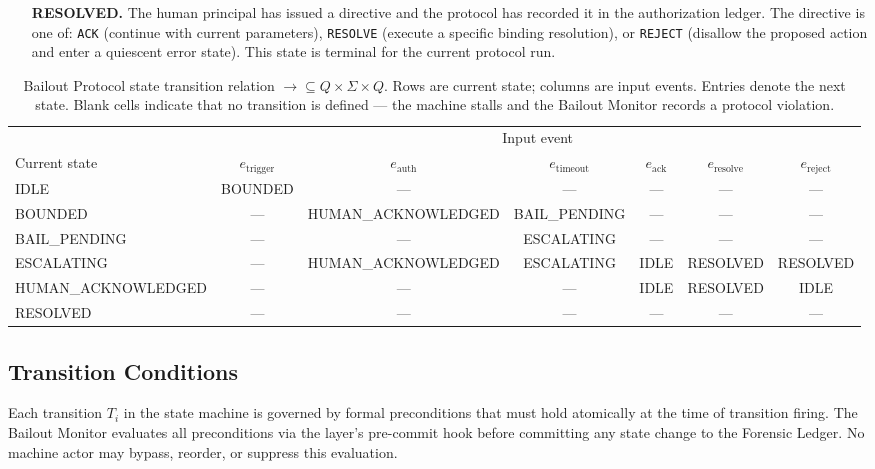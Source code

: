\begin{itemize}
\item[\textbf{RESOLVED.}] The human principal has issued a directive and the protocol has recorded it in the authorization ledger. The directive is one of: \texttt{ACK} (continue with current parameters), \texttt{RESOLVE} (execute a specific binding resolution), or \texttt{REJECT} (disallow the proposed action and enter a quiescent error state). This state is terminal for the current protocol run.
\end{itemize}

\begin{table}[htbp]
\caption{Bailout Protocol state transition relation $\rightarrow \subseteq Q \times \Sigma \times Q$. Rows are current state; columns are input events. Entries denote the next state. Blank cells indicate that no transition is defined — the machine stalls and the Bailout Monitor records a protocol violation.}
\label{tab:bailout-transition}
\begin{tabular}{@{}lcccccc@{}}
\toprule
 & \multicolumn{6}{c}{Input event} \\
\cmidrule(l){2-7}
Current state & $e_{\text{trigger}}$ & $e_{\text{auth}}$ & $e_{\text{timeout}}$ & $e_{\text{ack}}$ & $e_{\text{resolve}}$ & $e_{\text{reject}}$ \\
\midrule
IDLE              & BOUNDED            & — & — & — & — & — \\
BOUNDED           & — & HUMAN\_ACKNOWLEDGED & BAIL\_PENDING & — & — & — \\
BAIL\_PENDING     & — & — & ESCALATING & — & — & — \\
ESCALATING        & — & HUMAN\_ACKNOWLEDGED & ESCALATING & IDLE & RESOLVED & RESOLVED \\
HUMAN\_ACKNOWLEDGED & — & — & — & IDLE & RESOLVED & IDLE \\
RESOLVED          & — & — & — & — & — & — \\
\bottomrule
\end{tabular}
\end{table}

\subsection{Transition Conditions}\label{sec:transition-conditions}

Each transition $T_i$ in the state machine is governed by formal preconditions that must hold atomically at the time of transition firing. The Bailout Monitor evaluates all preconditions via the \fact{} layer's pre-commit hook before committing any state change to the Forensic Ledger. No machine actor may bypass, reorder, or suppress this evaluation.

